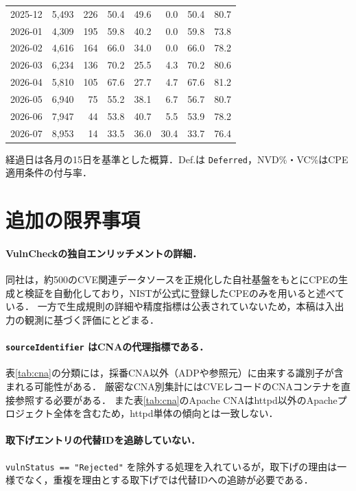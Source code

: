 \begin{table}[htbp]
\begin{center}
\begin{tabular}{lrrrrrrr}
    2025-12 & 5,493 & 226 & 50.4 & 49.6 & 0.0 & 50.4 & 80.7 \\
    2026-01 & 4,309 & 195 & 59.8 & 40.2 & 0.0 & 59.8 & 73.8 \\
    2026-02 & 4,616 & 164 & 66.0 & 34.0 & 0.0 & 66.0 & 78.2 \\
    2026-03 & 6,234 & 136 & 70.2 & 25.5 & 4.3 & 70.2 & 80.6 \\
    2026-04 & 5,810 & 105 & 67.6 & 27.7 & 4.7 & 67.6 & 81.2 \\
    2026-05 & 6,940 & 75 & 55.2 & 38.1 & 6.7 & 56.7 & 80.7 \\
    2026-06 & 7,947 & 44 & 53.8 & 40.7 & 5.5 & 53.9 & 78.2 \\
    2026-07 & 8,953 & 14 & 33.5 & 36.0 & 30.4 & 33.7 & 76.4 \\
    \hline
  \end{tabular}
  \end{center}
  \footnotesize
  経過日は各月の15日を基準とした概算．Def.は \texttt{Deferred}，NVD\%・VC\%はCPE適用条件の付与率．
\end{table}

\section{追加の限界事項}
\label{app:limits}

\paragraph{VulnCheckの独自エンリッチメントの詳細．}
同社は，約500のCVE関連データソースを正規化した自社基盤をもとにCPEの生成と検証を自動化しており，NISTが公式に登録したCPEのみを用いると述べている\cite{vulncheck-cpe}．
一方で生成規則の詳細や精度指標は公表されていないため，本稿は入出力の観測に基づく評価にとどまる．

\paragraph{\texttt{sourceIdentifier} はCNAの代理指標である．}
表\ref{tab:cna}の分類には，採番CNA以外（ADPや参照元）に由来する識別子が含まれる可能性がある．
厳密なCNA別集計にはCVEレコードのCNAコンテナを直接参照する必要がある．
また表\ref{tab:cna}のApache CNAはhttpd以外のApacheプロジェクト全体を含むため，httpd単体の傾向とは一致しない．

\paragraph{取下げエントリの代替IDを追跡していない．}
\texttt{vulnStatus == "Rejected"} を除外する処理を入れているが，取下げの理由は一様でなく，重複を理由とする取下げでは代替IDへの追跡が必要である．


